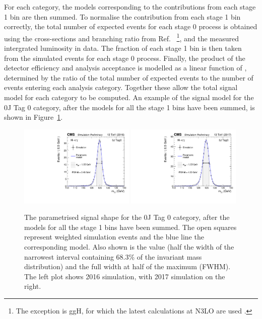 For each category, 
the models corresponding to the contributions from each stage 1 bin are then summed.
To normalise the contribution from each stage 1 bin correctly, 
the total number of expected events for each stage 0 process is obtained 
using the cross-sections and \Hgg branching ratio from Ref.~\cite{YR4} 
\footnote{The exception is ggH, 
for which the latest calculations at N3LO are used \cite{Anastasiou2015,Anastasiou2016}.},
and the measured intergrated luminosity in data.
The fraction of each stage 1 bin is then taken from the simulated events for each stage 0 process.
Finally, the product of the detector efficiency and analysis acceptance 
is modelled as a linear function of \mH, 
determined by the ratio of the total number of expected events 
to the number of events entering each analysis category.
Together these allow the total signal model for each category to be computed.
An example of the signal model for the 0J Tag 0 category, 
after the models for all the stage 1 bins have been summed, 
is shown in Figure~\ref{fig:sigbkg_cat}.

\begin{figure}[hptb]
\centering
\includegraphics[width=0.49\textwidth]{Figures/SigBkg/RECO_0J_Tag0_2016.pdf}
\includegraphics[width=0.49\textwidth]{Figures/SigBkg/RECO_0J_Tag0_2017.pdf}
\caption{
  The parametrised signal shape for the 0J Tag 0 category, 
  after the models for all the stage 1 bins have been summed.
  The open squares represent weighted simulation events and the blue line the
  corresponding model. Also shown is the \seff value (half the width of the narrowest interval
  containing 68.3\% of the invariant mass distribution) and the full width at half of the maximum
  (FWHM). The left plot shows 2016 simulation, with 2017 simulation on the right.
}
\label{fig:sigbkg_cat}
\end{figure}

